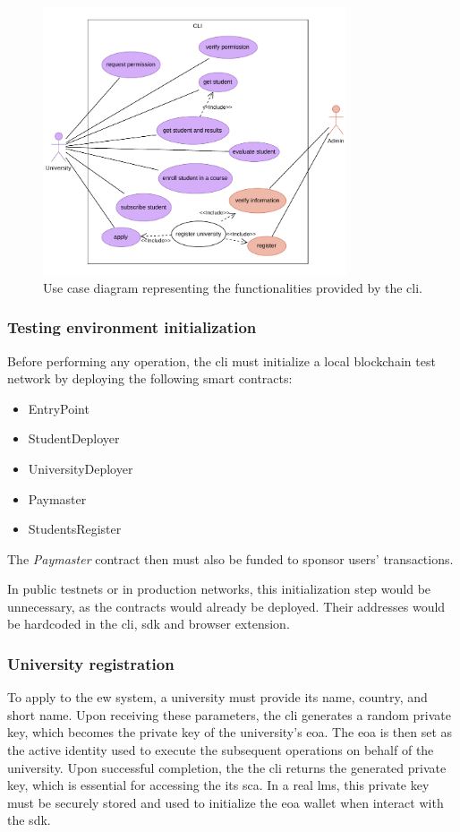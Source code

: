 \begin{figure}
  \centering
  \includegraphics[width=0.8\textwidth]{figures/CLI use case diagram.pdf}
  \caption[\acrshort{cli} use case diagram]{Use case diagram representing the functionalities provided by the \acrshort{cli}.}
  \label{fig:useCaseCli}
\end{figure}

\subsubsection{Testing environment initialization}
Before performing any operation, the \acrshort{cli} must initialize a local blockchain test network by deploying the following smart contracts:
\begin{itemize}
    \item EntryPoint
    \item StudentDeployer
    \item UniversityDeployer
    \item Paymaster
    \item StudentsRegister
\end{itemize}
The \textit{Paymaster} contract then must also be funded to sponsor users' transactions.

In public testnets or in production networks, this initialization step would be unnecessary, as the contracts would already be deployed. Their addresses would be hardcoded in the \acrshort{cli}, \acrshort{sdk} and browser extension.

\subsubsection{University registration}
\label{sssec:applyEw}
To apply to the \acrshort{ew} system, a university must provide its name, country, and short name. Upon receiving these parameters, the \acrshort{cli} generates a random private key, which becomes the private key of the university's \acrshort{eoa}. The \acrshort{eoa} is then set as the active identity used to execute the subsequent operations on behalf of the university. Upon successful completion, the the \acrshort{cli} returns the generated private key, which is essential for accessing the its \acrshort{sca}. In a real \acrshort{lms}, this private key must be securely stored and used to initialize the \acrshort{eoa} wallet when interact with the \acrshort{sdk}. 

